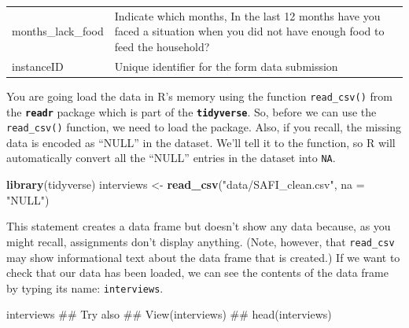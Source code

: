 \documentclass[]{book}
\newenvironment{Shaded}{\begin{snugshade}}{\end{snugshade}}
\newcommand{\KeywordTok}[1]{\textcolor[rgb]{0.13,0.29,0.53}{\textbf{#1}}}
\newcommand{\DataTypeTok}[1]{\textcolor[rgb]{0.13,0.29,0.53}{#1}}
\newcommand{\StringTok}[1]{\textcolor[rgb]{0.31,0.60,0.02}{#1}}
\newcommand{\NormalTok}[1]{#1}
\begin{document}
\begin{longtable}[]{@{}ll@{}}
\begin{minipage}[t]{0.16\columnwidth}
months\_lack\_food\strut
\end{minipage} & \begin{minipage}[t]{0.16\columnwidth}\raggedright\strut
Indicate which months, In the last 12 months have you faced a situation
when you did not have enough food to feed the household?\strut
\end{minipage}\tabularnewline
\begin{minipage}[t]{0.16\columnwidth}\raggedright\strut
instanceID\strut
\end{minipage} & \begin{minipage}[t]{0.16\columnwidth}\raggedright\strut
Unique identifier for the form data submission\strut
\end{minipage}\tabularnewline
\bottomrule
\end{longtable}

You are going load the data in R's memory using the function
\texttt{read\_csv()} from the \textbf{\texttt{readr}} package which is
part of the \textbf{\texttt{tidyverse}}. So, before we can use the
\texttt{read\_csv()} function, we need to load the package. Also, if you
recall, the missing data is encoded as ``NULL'' in the dataset. We'll
tell it to the function, so R will automatically convert all the
``NULL'' entries in the dataset into \texttt{NA}.

\begin{Shaded}
\begin{Highlighting}[]
\KeywordTok{library}\NormalTok{(tidyverse)}
\NormalTok{interviews <-}\StringTok{ }\KeywordTok{read_csv}\NormalTok{(}\StringTok{"data/SAFI_clean.csv"}\NormalTok{, }\DataTypeTok{na =} \StringTok{"NULL"}\NormalTok{)}
\end{Highlighting}
\end{Shaded}

This statement creates a data frame but doesn't show any data because,
as you might recall, assignments don't display anything. (Note, however,
that \texttt{read\_csv} may show informational text about the data frame
that is created.) If we want to check that our data has been loaded, we
can see the contents of the data frame by typing its name:
\texttt{interviews}.

\begin{Shaded}
\begin{Highlighting}[]
\NormalTok{interviews}
\NormalTok{## Try also}
\NormalTok{## View(interviews)}
\NormalTok{## head(interviews)}
\end{Highlighting}
\end{Shaded}
\end{document}
